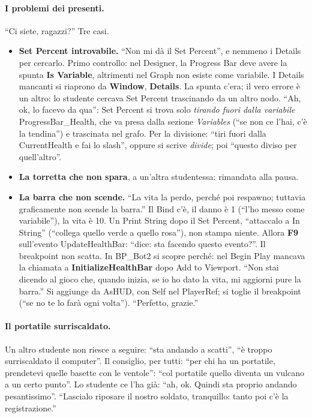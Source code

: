 \paragraph{I problemi dei presenti.} ``Ci siete, ragazzi?'' Tre casi.
\begin{itemize}
  \item \textbf{Set Percent introvabile.} ``Non mi dà il Set Percent'', e nemmeno i
        Details per cercarlo. Primo controllo: nel Designer, la Progress Bar deve avere la
        spunta \textbf{Is Variable}, altrimenti nel Graph non esiste come variabile. I
        Details mancanti si riaprono da \textbf{Window}, \textbf{Details}. La spunta c'era;
        il vero errore è un altro: lo studente cercava Set Percent trascinando da un altro
        nodo. ``Ah, ok, lo facevo da qua'': Set Percent si trova solo \emph{tirando fuori
        dalla variabile} ProgressBar\_Health, che va presa dalla sezione \emph{Variables}
        (``se non ce l'hai, c'è la tendina'') e trascinata nel grafo. Per la divisione:
        ``tiri fuori dalla CurrentHealth e fai lo slash'', oppure si scrive
        \emph{divide}; poi ``questo diviso per quell'altro''.
  \item \textbf{La torretta che non spara}, a un'altra studentessa: rimandata alla pausa.
  \item \textbf{La barra che non scende.} ``La vita la perdo, perché poi respawno; tuttavia
        graficamente non scende la barra.'' Il Bind c'è, il danno è 1 (``l'ho messo come
        variabile''), la vita è 10. Un Print String dopo il Set Percent, ``attaccalo a In
        String'' (``collega quello verde a quello rosa''), non stampa niente. Allora
        \textbf{F9} sull'evento UpdateHealthBar: ``dice: sta facendo questo evento?''. Il
        breakpoint non scatta. In BP\_Bot2 si scopre perché: nel Begin Play mancava la
        chiamata a \textbf{InitializeHealthBar} dopo Add to Viewport. ``Non stai dicendo al
        gioco che, quando inizia, se io ho dato la vita, mi aggiorni pure la barra.'' Si
        aggiunge da AsHUD, con Self nel PlayerRef; si toglie il breakpoint (``se no te lo
        farà ogni volta''). ``Perfetto, grazie.''
\end{itemize}

\paragraph{Il portatile surriscaldato.} Un altro studente non riesce a seguire: ``sta
andando a scatti'', ``è troppo surriscaldato il computer''. Il consiglio, per tutti: ``per
chi ha un portatile, prendetevi quelle basette con le ventole'': ``col portatile quello
diventa un vulcano a un certo punto''. Lo studente ce l'ha già: ``ah, ok. Quindi sta proprio
andando pesantissimo''. ``Lascialo riposare il nostro soldato, tranquillo: tanto poi c'è la
registrazione.''

